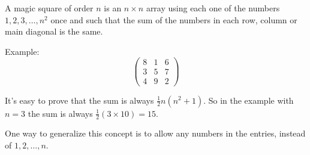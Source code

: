 \documentclass[12pt]{article}
\begin{document}
A magic square of order $n$ is an $n\times n$ array using each one of the numbers $1,2,3,\ldots,n^2$ once and such that the sum of the numbers in each row, column or main diagonal is the same.

Example:
\begin{equation*}
\begin{pmatrix}
8 & 1 & 6\\
3 & 5 & 7\\
4 & 9  & 2
\end{pmatrix}
\end{equation*}

It's easy to prove that the sum is always $\frac{1}{2}n(n^2+1)$. So in the example with $n=3$ the sum is always $\frac{1}{2}(3\times 10)=15$.

One way to generalize this concept is to allow any numbers in the entries, instead of $1,2,\ldots,n$.
\end{document}
